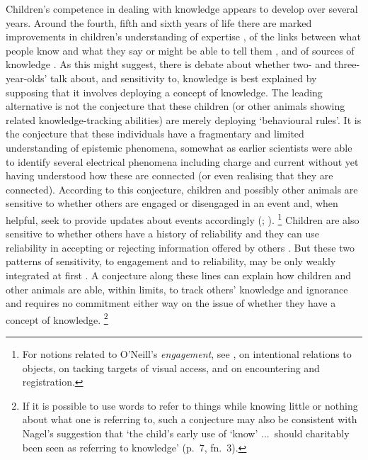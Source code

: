\documentclass[12pt,\papersize]{extarticle}
\begin{document}
Children's competence in dealing with knowledge appears to develop over several years.
Around the fourth, fifth and sixth years of life there are marked improvements in 
children's understanding 
of expertise 
\citep{lutz_early_2002,sobel_children_2010},
of the links between what people know and what they say or might be able to tell them \citep{Robinson:1994nw,Robinson:2010uq},
and
of sources of knowledge \citep{ONeill:1992ct,ONeill:2001co,Robinson:2006vl}.
As this might suggest,
there is debate about whether two- and three-year-olds' talk about, and sensitivity to, knowledge is best explained by supposing that it involves deploying a concept of knowledge.
The leading alternative is not the conjecture that these children (or other animals showing related knowledge-tracking abilities) are merely deploying `behavioural rules'.
It is the conjecture that these individuals have a fragmentary and limited understanding of epistemic phenomena, somewhat as earlier scientists were able to identify several electrical phenomena including charge and current without yet having understood how these are connected (or even realising that they are connected).
According to this conjecture, children and possibly other animals are sensitive to whether others are engaged or disengaged in an event and, when helpful, seek to provide updates about events accordingly
(\citealp[pp.\ 88-9]{ONeill:2005ff};
\citealp{viranyi_nonverbal_2005}).%
\footnote{
For notions related to O'Neill's \emph{engagement}, see 
\citet{Doherty:2006wz}, 
\citet{Gomez:2007fk} on intentional relations to objects, 
 \citet[p.\ 58]{Call:2005qe} on tacking targets of visual access,
and \citet{butterfill_minimal} on encountering and registration.
}
Children are also sensitive to whether others have a history of reliability and they can use reliability in accepting or rejecting information offered by others \citep{Koenig:2005rc,birch_three-_2008}.
But these two patterns of sensitivity, to engagement and to reliability, may be only weakly integrated at first \citep{nurmsoo_childrens_2009,nurmsoo_identifying_2009}.
A conjecture along these lines can explain how children and other animals are able, within limits, to track others' knowledge and ignorance 
and requires no commitment either way on the issue of whether they have a concept of knowledge.%
\footnote{
If it is possible to use words to refer to things while  knowing little or nothing about what one is referring to,
such a conjecture may also be consistent with Nagel's suggestion that `the child's early use of `know' ...\ should charitably been seen as referring to knowledge' (p.\ 7, fn.\ 3).
}
\end{document}
